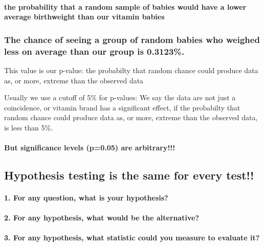 \documentclass[]{article}
\let\oldparagraph\paragraph
\renewcommand{\paragraph}[1]{\oldparagraph{#1}\mbox{}}
\begin{document}
{{{{\paragraph{the probability that a random sample of babies would have a
lower average birthweight than our vitamin
babies}\label{the-probability-that-a-random-sample-of-babies-would-have-a-lower-average-birthweight-than-our-vitamin-babies}

\subsubsection{The chance of seeing a group of random babies who weighed
less on average than our group is
0.3123\%.}\label{the-chance-of-seeing-a-group-of-random-babies-who-weighed-less-on-average-than-our-group-is-0.3123.}

This value is our p-value: the probabilty that random chance could
produce data as, or more, extreme than the observed data

Usually we use a cutoff of 5\% for p-values: We say the data are not
just a coincidence, or vitamin brand has a significant effect, if the
probabilty that random chance could produce data as, or more, extreme
than the observed data, is less than 5\%.

\paragraph{But significance levels (p=0.05) are
arbitrary!!!}\label{but-significance-levels-p0.05-are-arbitrary}

\subsection{Hypothesis testing is the same for every
test!!}\label{hypothesis-testing-is-the-same-for-every-test}

\paragraph{1. For any question, what is your
hypothesis?}\label{for-any-question-what-is-your-hypothesis}

\paragraph{2. For any hypothesis, what would be the
alternative?}\label{for-any-hypothesis-what-would-be-the-alternative}

\paragraph{3. For any hypothesis, what statistic could you measure to
evaluate
it?}\label{for-any-hypothesis-what-statistic-could-you-measure-to-evaluate-it}

}}}}
\end{document}
